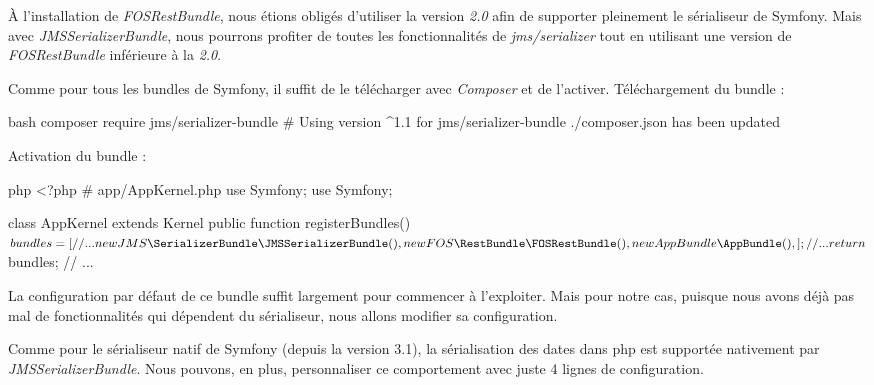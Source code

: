 \documentclass[big]{zmdocument}
\begin{document}
À l'installation de \textit{FOSRestBundle}, nous étions obligés d'utiliser la version \textit{2.0} afin de supporter pleinement le sérialiseur de Symfony. Mais avec \textit{JMSSerializerBundle}, nous pourrons profiter de toutes les fonctionnalités de \textit{jms/serializer} tout en utilisant une version de \textit{FOSRestBundle} inférieure à la \textit{2.0}.







Comme pour tous les bundles de Symfony, il suffit de le télécharger avec \textit{Composer} et de l'activer.
Téléchargement du bundle :



\begin{CodeBlock}{bash}
composer require jms/serializer-bundle
# Using version ^1.1 for jms/serializer-bundle
./composer.json has been updated
\end{CodeBlock}



Activation du bundle :



\begin{CodeBlock}{php}
<?php
# app/AppKernel.php
use Symfony\Component\HttpKernel\Kernel;
use Symfony\Component\Config\Loader\LoaderInterface;

class AppKernel extends Kernel
{
    public function registerBundles()
    {
        $bundles = [
            // ...
            new JMS\SerializerBundle\JMSSerializerBundle(),
            new FOS\RestBundle\FOSRestBundle(),
            new AppBundle\AppBundle(),
        ];
        // ...
        return $bundles;
    }
    // ...
}
\end{CodeBlock}





La configuration par défaut de ce bundle suffit largement pour commencer à l'exploiter.
Mais pour notre cas, puisque nous avons déjà pas mal de fonctionnalités qui dépendent du sérialiseur, nous allons modifier sa configuration.





Comme pour le sérialiseur natif de Symfony (depuis la version 3.1), la sérialisation des dates dans php est supportée nativement par \textit{JMSSerializerBundle}. Nous pouvons, en plus, personnaliser ce comportement avec juste 4 lignes de configuration.
\end{document}
